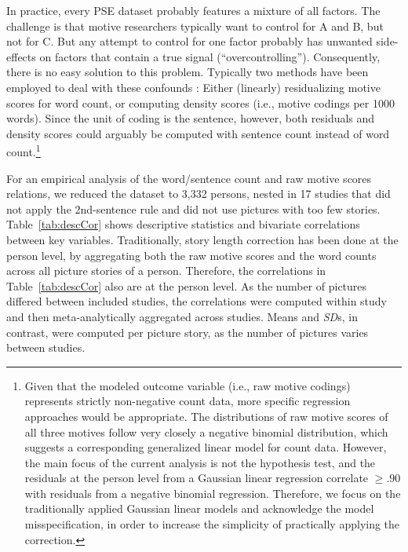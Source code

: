 \documentclass[jou,a4paper]{apa6}\usepackage[]{graphicx}\usepackage[]{color}
\begin{document}
In practice, every PSE dataset probably features a mixture of all factors. The challenge is that motive researchers typically want to control for A and B, but not for C. But any attempt to control for one factor probably has unwanted side-effects on factors that contain a true signal (``overcontrolling''). Consequently, there is no easy solution to this problem. Typically two methods have been employed to deal with these confounds \parencite{schultheiss_MeasuringImplicitMotives_2007}: Either (linearly) residualizing motive scores for word count, or computing density scores (i.e., motive codings per 1000 words). Since the unit of coding is the sentence, however, both residuals and density scores could arguably be computed with sentence count instead of word count.\footnote{Given that the modeled outcome variable (i.e., raw motive codings) represents strictly non-negative count data, more specific regression approaches would be appropriate. The distributions of raw motive scores of all three motives follow very closely a negative binomial distribution, which suggests a corresponding generalized linear model for count data. However, the main focus of the current analysis is not the hypothesis test, and the residuals at the person level from a Gaussian linear regression correlate $\geq .90$ with residuals from a negative binomial regression. Therefore, we focus on the traditionally applied Gaussian linear models and acknowledge the model misspecification, in order to increase the simplicity of practically applying the correction.}

For an empirical analysis of the word/sentence count and raw motive scores relations, we reduced the dataset to 3,332 persons, nested in 17 studies that did not apply the 2nd-sentence rule and did not use pictures with too few stories. 
Table~\ref{tab:descCor} shows descriptive statistics and bivariate correlations between key variables. 
Traditionally, story length correction has been done at the person level, by aggregating both the raw motive scores and the word counts across all picture stories of a person. 
Therefore, the correlations in Table~\ref{tab:descCor} also are at the person level. 
As the number of pictures differed between included studies, the correlations were computed within study and then meta-analytically aggregated across studies. Means and \emph{SD}s, in contrast, were computed per picture story, as the number of pictures varies between studies. 
\end{document}
